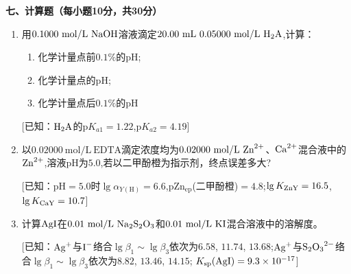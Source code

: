 \vspace{0.5cm}
\noindent\textbf{七、计算题（每小题10分，共30分）}

\begin{enumerate}[label=\arabic*., itemsep=1.5ex]
    \item 用$0.1000\ \mathrm{mol/L}\ \ce{NaOH}$溶液滴定$20.00\ \mathrm{mL}\ 0.05000\ \mathrm{mol/L}\ \ce{H2A}$,计算：
    \begin{enumerate}[label=(\arabic*), noitemsep, topsep=0pt, partopsep=0pt]
        \item 化学计量点前$0.1\%$的$\mathrm{pH}$;
        \item 化学计量点的$\mathrm{pH}$;
        \item 化学计量点后$0.1\%$的$\mathrm{pH}$
    \end{enumerate}
    [已知：$\ce{H2A}$的$\mathrm{p}K_{a1}=1.22$,$\mathrm{p}K_{a2}=4.19$]
    \item 以$0.02000\ \mathrm{mol/L}\ \mathrm{EDTA}$滴定浓度均为$0.02000\ \mathrm{mol/L}\ \ce{Zn^{2+}}$、$\ce{Ca^{2+}}$混合液中的$\ce{Zn^{2+}}$,溶液$\mathrm{pH}$为$5.0$,若以二甲酚橙为指示剂，终点误差多大?
    
    [已知：$\mathrm{pH}=5.0$时$\lg\alpha_{Y(\mathrm{H})}=6.6$,$\mathrm{pZn_{ep}}$(二甲酚橙)$=4.8$;$\lg K_{\ce{ZnY}}=16.5$,$\lg K_{\ce{CaY}}=10.7$]
    \item 计算$\ce{AgI}$在$0.01\ \mathrm{mol/L}\ \ce{Na2S2O3}$和$0.01\ \mathrm{mol/L}\ \ce{KI}$混合溶液中的溶解度。
    
    [已知：$\ce{Ag^+}$与$\ce{I^-}$络合$\lg\beta_1\sim\lg\beta_3$依次为$6.58$, $11.74$, $13.68$;$\ce{Ag^+}$与$\ce{S2O3^{2-}}$络合$\lg\beta_1\sim\lg\beta_3$依次为$8.82$, $13.46$, $14.15$; $K_{\mathrm{sp}}(\ce{AgI})=9.3\times10^{-17}$]
\end{enumerate}